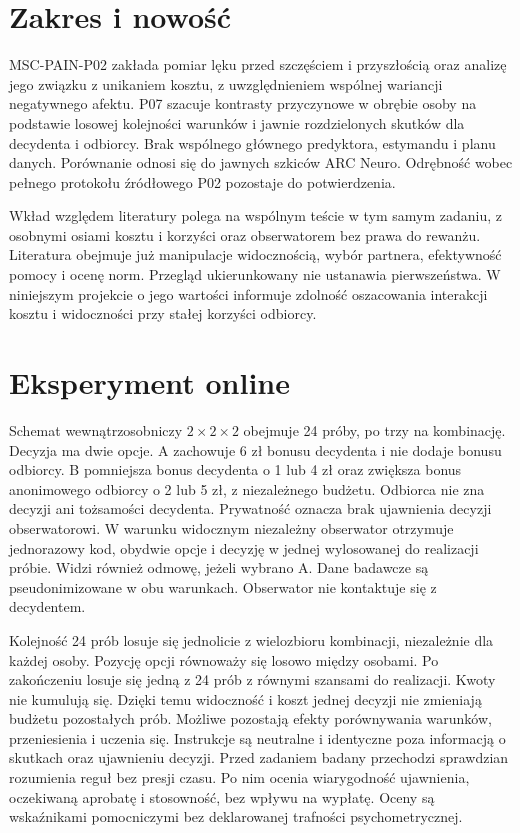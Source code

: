 \documentclass[11pt,a4paper]{article}
\begin{document}
\section{Zakres i nowość}
MSC-PAIN-P02 zakłada pomiar lęku przed szczęściem i przyszłością oraz analizę jego związku z unikaniem kosztu, z uwzględnieniem wspólnej wariancji negatywnego afektu. P07 szacuje kontrasty przyczynowe w obrębie osoby na podstawie losowej kolejności warunków i jawnie rozdzielonych skutków dla decydenta i odbiorcy. Brak wspólnego głównego predyktora, estymandu i planu danych. Porównanie odnosi się do jawnych szkiców ARC Neuro. Odrębność wobec pełnego protokołu źródłowego P02 pozostaje do potwierdzenia.

Wkład względem literatury polega na wspólnym teście w tym samym zadaniu, z osobnymi osiami kosztu i korzyści oraz obserwatorem bez prawa do rewanżu. Literatura obejmuje już manipulacje widocznością, wybór partnera, efektywność pomocy i ocenę norm. Przegląd ukierunkowany nie ustanawia pierwszeństwa. W niniejszym projekcie o jego wartości informuje zdolność oszacowania interakcji kosztu i widoczności przy stałej korzyści odbiorcy.

\section{Eksperyment online}
Schemat wewnątrzosobniczy $2\times2\times2$ obejmuje 24 próby, po trzy na kombinację. Decyzja ma dwie opcje. A zachowuje 6 zł bonusu decydenta i nie dodaje bonusu odbiorcy. B pomniejsza bonus decydenta o 1 lub 4 zł oraz zwiększa bonus anonimowego odbiorcy o 2 lub 5 zł, z niezależnego budżetu. Odbiorca nie zna decyzji ani tożsamości decydenta. Prywatność oznacza brak ujawnienia decyzji obserwatorowi. W warunku widocznym niezależny obserwator otrzymuje jednorazowy kod, obydwie opcje i decyzję w jednej wylosowanej do realizacji próbie. Widzi również odmowę, jeżeli wybrano A. Dane badawcze są pseudonimizowane w obu warunkach. Obserwator nie kontaktuje się z decydentem.

Kolejność 24 prób losuje się jednolicie z wielozbioru kombinacji, niezależnie dla każdej osoby. Pozycję opcji równoważy się losowo między osobami. Po zakończeniu losuje się jedną z 24 prób z równymi szansami do realizacji. Kwoty nie kumulują się. Dzięki temu widoczność i koszt jednej decyzji nie zmieniają budżetu pozostałych prób. Możliwe pozostają efekty porównywania warunków, przeniesienia i uczenia się. Instrukcje są neutralne i identyczne poza informacją o skutkach oraz ujawnieniu decyzji. Przed zadaniem badany przechodzi sprawdzian rozumienia reguł bez presji czasu. Po nim ocenia wiarygodność ujawnienia, oczekiwaną aprobatę i stosowność, bez wpływu na wypłatę. Oceny są wskaźnikami pomocniczymi bez deklarowanej trafności psychometrycznej.
\end{document}
